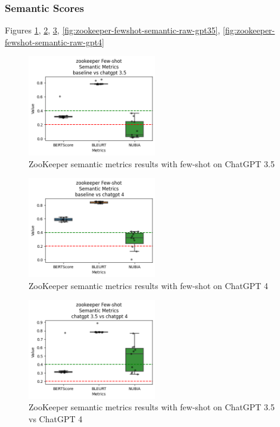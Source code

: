 \documentclass[conference]{IEEEtran}
\begin{document}
\subsubsection{Semantic Scores}

Figures \ref{fig:zookeeper-fewshot-semantic-gpt35}, \ref{fig:zookeeper-fewshot-semantic-gpt4}, \ref{fig:zookeeper-fewshot-semantic-gpt35-gpt4}, \ref{fig:zookeeper-fewshot-semantic-raw-gpt35}, \ref{fig:zookeeper-fewshot-semantic-raw-gpt4}

\begin{figure}[h!]
    \centering
    \includegraphics[width=0.5\textwidth]{milestone4/img/zookeeper-few-shot-semantic-3.5.png}
    \caption{ZooKeeper semantic metrics results with few-shot on ChatGPT 3.5}
    \label{fig:zookeeper-fewshot-semantic-gpt35}
\end{figure}

\begin{figure}[h!]
    \centering
    \includegraphics[width=0.5\textwidth]{milestone4/img/zookeeper-few-shot-semantic-4.png}
    \caption{ZooKeeper semantic metrics results with few-shot on ChatGPT 4}
    \label{fig:zookeeper-fewshot-semantic-gpt4}
\end{figure}

\begin{figure}[h!]
    \centering
    \includegraphics[width=0.5\textwidth]{milestone4/img/zookeeper-few-shot-semantic-35-4.png}
    \caption{ZooKeeper semantic metrics results with few-shot on ChatGPT 3.5 vs ChatGPT 4}
    \label{fig:zookeeper-fewshot-semantic-gpt35-gpt4}
\end{figure}
\end{document}
